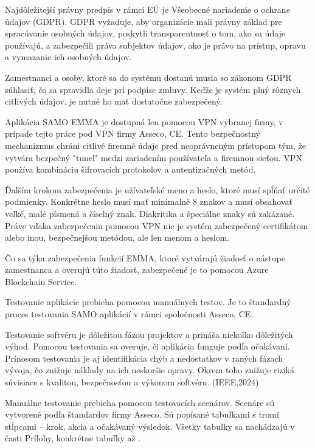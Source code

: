 Najdôležitejší právny predpis v rámci EÚ je Všeobecné nariadenie o ochrane údajov (GDPR). GDPR vyžaduje, aby organizácie mali právny základ pre spracúvanie osobných údajov, poskytli transparentnosť o tom, ako sa údaje používajú, a zabezpečili práva subjektov údajov, ako je právo na prístup, opravu a vymazanie ich osobných údajov.

Zamestnanci a osoby, ktoré sa do systému dostanú musia so zákonom GDPR súhlasiť, čo sa spravidla deje pri podpise zmluvy. Keďže je systém plný rôznych citlivých údajov, je nutné ho mať dostatočne zabezpečený.

Aplikácia SAMO EMMA je dostupná len pomocou VPN vybranej firmy, v prípade tejto práce pod VPN firmy Asseco, CE. Tento bezpečnostný mechanizmus chráni citlivé firemné údaje pred neoprávneným prístupom tým, že vytvára bezpečný "tunel" medzi zariadením používateľa a firemnou sieťou. VPN používa kombináciu šifrovacích protokolov a autentizačných metód.

Ďalším krokom zabezpečenia je užívateľské meno a heslo, ktoré musí spĺňať určité podmienky. Konkrétne heslo musí mať minimalně 8 znakov a musí obsahovať veľké, malé písmená a číselný znak. Diakritika a špeciálne znaky sú zakázané. Práve vďaka zabezpečeniu pomocou VPN nie je systém zabezpečený certifikátom alebo inou, bezpečnejšou metódou, ale len menom a heslom.

Čo sa týka zabezpečenia funkcií EMMA, ktoré vytvárajú žiadosť o nástupe zamestnanca a overujú túto žiadosť, zabezpečené je to pomocou Azure Blockchain Service.


Testovanie aplikácie prebieha pomocou manuálnych testov. Je to štandardný proces testovania SAMO aplikácií v rámci spoločnosti Asseco, CE. 

Testovanie softvéru je dôležitou fázou projektov a prináša niekoľko dôležitých výhod. Pomocou testovania sa overuje, či aplikácia funguje podľa očakávaní. Prínosom testovania je aj identifikácia chýb a nedostatkov v raných fázach vývoja, čo znižuje náklady na ich neskoršie opravy. Okrem toho znižuje riziká súvisiace s kvalitou, bezpečnosťou a výkonom softvéru. \scr(IEEE,2024)

Manuálne testovanie prebieha pomocou testovacích scenárov. Scenáre sú vytvorené podľa štandardov firmy Asseco. Sú popísané tabuľkami s tromi stĺpcami -- krok, akcia a očakávaný výsledok. Všetky tabuľky sa nachádzajú v časti Prílohy, konkrétne tabuľky  až .

